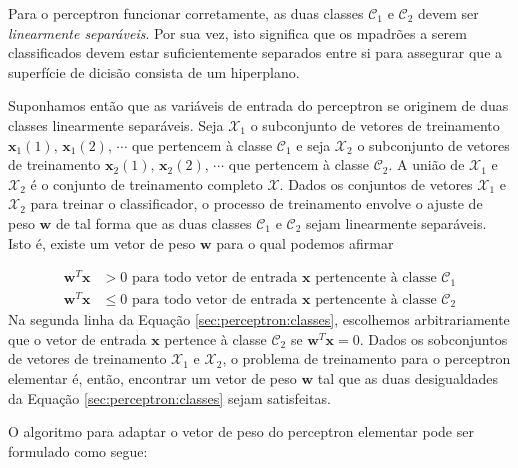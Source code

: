 Para o perceptron funcionar corretamente, as duas classes $\mathscr{C}_1$ e $\mathscr{C}_2$ devem ser \textit{linearmente separáveis}. Por sua vez, isto significa que os mpadrões a serem classificados devem estar suficientemente separados entre si para assegurar que a superfície de dicisão consista de um hiperplano.

Suponhamos então que as variáveis de entrada do perceptron se originem de duas classes linearmente separáveis. Seja $\mathscr{X}_1$ o subconjunto de vetores de treinamento $\textbf{x}_1(1),\, \textbf{x}_1(2), \, \cdots $ que pertencem à classe $\mathscr{C}_1$ e seja $\mathscr{X}_2$ o subconjunto de vetores de treinamento $\textbf{x}_2(1),\, \textbf{x}_2(2), \, \cdots $ que pertencem à classe $\mathscr{C}_2$. A união de $\mathscr{X}_1$ e $\mathscr{X}_2$ é o conjunto de treinamento completo $\mathscr{X}$. Dados os conjuntos de vetores $\mathscr{X}_1$ e $\mathscr{X}_2$ para treinar o classificador, o processo de treinamento envolve o ajuste de peso $\textbf{w}$ de tal forma que as duas classes $\mathscr{C}_1$ e $\mathscr{C}_2$ sejam linearmente separáveis. Isto é, existe um vetor de peso $\textbf{w}$ para o qual podemos afirmar

\begin{equation}
  \begin{aligned} \label{sec:perceptron:classes}
    \textbf{w}^T\textbf{x} &> 0 \text{ para todo vetor de entrada $\textbf{x}$ pertencente à classe  $\mathscr{C}_1$} \\       
    \textbf{w}^T\textbf{x} &\leq 0 \text{ para todo vetor de entrada $\textbf{x}$ pertencente à classe  $\mathscr{C}_2$}
  \end{aligned}
\end{equation}
Na segunda linha da Equação \ref{sec:perceptron:classes}, escolhemos arbitrariamente que o vetor de entrada $\textbf{x}$ pertence à classe $\mathscr{C}_2$ se $\textbf{w}^T\textbf{x}=0$. Dados os sobconjuntos de vetores de treinamento $\mathscr{X}_1$ e $\mathscr{X}_2$, o problema de treinamento para o perceptron elementar é, então, encontrar um vetor de peso $\textbf{w}$ tal que as duas desigualdades da Equação \ref{sec:perceptron:classes} sejam satisfeitas.

O algoritmo para adaptar o vetor de peso do perceptron elementar pode ser formulado como segue:

